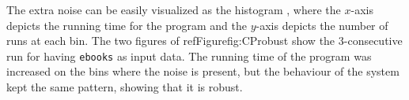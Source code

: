 The extra noise can be easily visualized as the histogram , where the $x$-axis depicts the running time for the program and the $y$-axis depicts the number of runs at each bin. The two figures of refFigure{fig:CProbust} show the $3$-consecutive run for \bzip having {\tt ebooks} as input data. The running time of the program was increased on the bins where the noise is present, but the behaviour of the system kept the same pattern, showing that it is robust.



